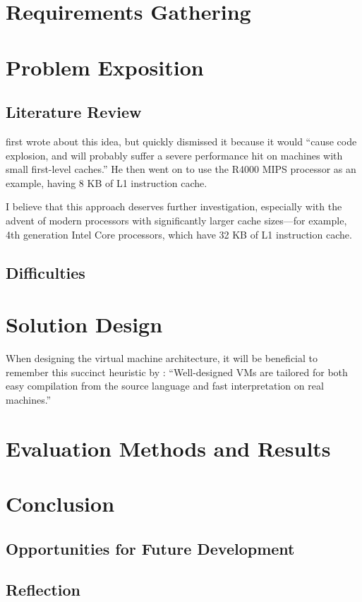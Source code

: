 \chapter{Requirements Gathering}

\chapter{Problem Exposition}
	\section{Literature Review}
		\cite{stackcaching} first wrote about this idea, but quickly dismissed it because it would ``cause code explosion, and will probably suffer a severe performance hit on machines with small first-level caches.'' He then went on to use the R4000 MIPS processor as an example, having 8 KB of L1 instruction cache.
	
		I believe that this approach deserves further investigation, especially with the advent of modern processors with significantly larger cache sizes---for example, 4th generation Intel Core processors, which have 32 KB of L1 instruction cache.\citep{haswellarch}
	
	\section{Difficulties}

\chapter{Solution Design}
	When designing the virtual machine architecture, it will be beneficial to remember this succinct heuristic by \cite{structureinterpreters}: ``Well-designed VMs are tailored for both easy compilation from the source language and fast interpretation on real machines.''

\chapter{Evaluation Methods and Results}

\chapter{Conclusion}
	
	\section{Opportunities for Future Development}
	
	\section{Reflection}

\bibliographysection

